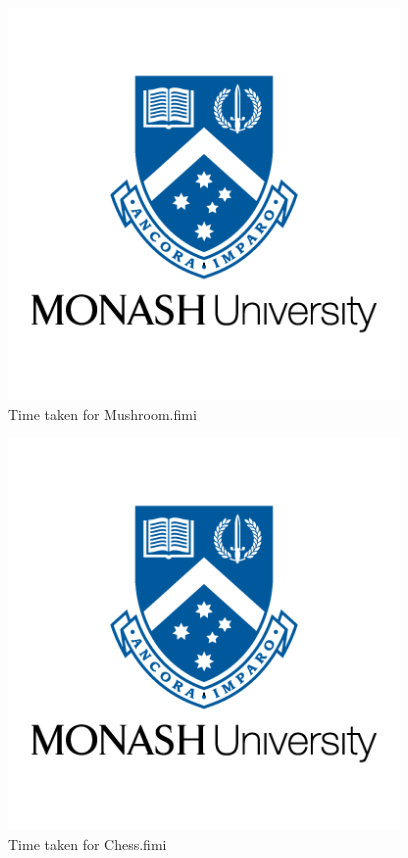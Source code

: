 \documentclass[10pt,a4paper]{article}
\begin{document}
\begin{figure}[h!]
\begin{center}
  \includegraphics[width=28em]{monash-university-logo.png}
\end{center}
  \caption{Time taken for Mushroom.fimi}
  \label{fig:SSPresults1}
\end{figure}

\vspace{1cm}

\begin{figure}[h!]
\begin{center}
  \includegraphics[width=28em]{monash-university-logo.png}
\end{center}
  \caption{Time taken for Chess.fimi}
  \label{fig:SSPresults1}
\end{figure}
\end{document}
